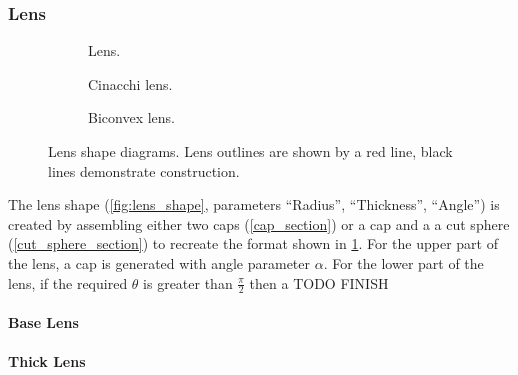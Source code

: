 \subsubsection{Lens}
\begin{figure}
  \begin{center}
    \begin{subfigure}{0.3\textwidth}
      
      \caption{Lens.}
      \label{fig:lens_diagram}
    \end{subfigure}
    \begin{subfigure}{0.3\textwidth}
      
      \caption{Cinacchi lens.}
      \label{fig:cinacchi_lens_diagram}
    \end{subfigure}
    \begin{subfigure}{0.3\textwidth}
      
      \caption{Biconvex lens.}
      \label{fig:biconvex_lens_diagram}
    \end{subfigure}
  \end{center}
  \caption{Lens shape diagrams. Lens outlines are shown by a red line, black lines demonstrate construction.}
  \label{fig:lens_descriptions}
\end{figure}

The lens shape (\cref{fig:lens_shape}, parameters ``Radius'', ``Thickness'', ``Angle'') is created by assembling either two caps (\cref{cap_section}) or a cap and a a cut sphere (\cref{cut_sphere_section}) to recreate the format shown in \cref{fig:lens_diagram}. For the upper part of the lens, a cap is generated with angle parameter $\alpha$. For the lower part of the lens, if the required $\theta$ is greater than $\frac{\pi}{2}$ then a TODO FINISH
\paragraph{Base Lens}
\label{base_lens_para}
\paragraph{Thick Lens}


